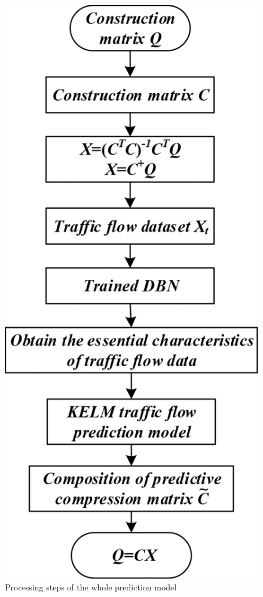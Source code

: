 \begin{figure}
	\centering
	\includegraphics[height=0.3\textheight,keepaspectratio]{img/steps.jpg}
	\caption{Processing steps of the whole prediction model \cite{Han.2020}}
	\label{fig:steps}
\end{figure}

